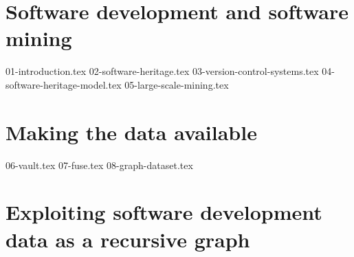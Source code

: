 \documentclass[a4paper,11pt,openbib,draft]{memoir}
\begin{document}
\raggedbottom

\frontmatter
{}
%

\clearemptydoublepage

%

\clearemptydoublepage
%

\clearemptydoublepage
%


\renewcommand{\contentsname}{Table of Contents}
\tableofcontents*
{}
%

\iffalse
\listoftables
\addtocontents{lot}{\par\nobreak\textbf{{\scshape Table} \hfill Page}\par\nobreak}
\clearemptydoublepage
\listoffigures
\addtocontents{lof}{\par\nobreak\textbf{{\scshape Figure} \hfill Page}\par\nobreak}
\clearemptydoublepage
\fi
%
%
\mainmatter
%


\part{Software development and software mining}

{01-introduction.tex}
{02-software-heritage.tex}
{03-version-control-systems.tex}
{04-software-heritage-model.tex}
{05-large-scale-mining.tex}

\part{Making the data available}

{06-vault.tex}
{07-fuse.tex}
{08-graph-dataset.tex}

\part{Exploiting software development data as a recursive graph}
\end{document}
